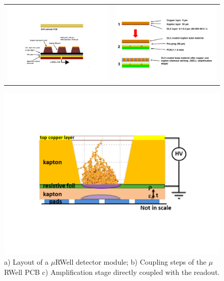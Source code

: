 %
\begin{figure}[h!]
\centering
\begin{tabular}{cc}
   \includegraphics[width=0.5\linewidth]{Figures/Muon/microrwell-sketch.pdf} &
   \includegraphics[width=0.5\linewidth]{Figures/Muon/microrwell-sketch-2.pdf} \\
\end{tabular}
   \vspace{1cm}
   \begin{minipage}{.5\textwidth}
   \centering
   \includegraphics[width=\linewidth]{Figures/Muon/microrwell-sketch-3.pdf}
   \end{minipage}
\caption{a) Layout of a $\mu$RWell detector module; b) Coupling steps of the $\mu$RWell PCB c) Amplification stage directly coupled with the readout. }
\label{fig:urwell-sketch}
\end{figure}


